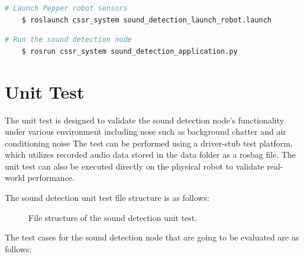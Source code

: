 \documentclass{CSSRforAfrica}
\begin{document}
\begin{lstlisting}[style=withoutNumbering, language=bash]
	# Launch Pepper robot sensors 
	$ roslaunch cssr_system sound_detection_launch_robot.launch
\end{lstlisting}

\begin{lstlisting}[style=withoutNumbering, language=bash]
	# Run the sound detection node
	$ rosrun cssr_system sound_detection_application.py
\end{lstlisting}

\newpage
\section{Unit Test}
The unit test is designed to validate the sound detection node's functionality under various environment including nose such as background chatter and air conditioning noise  
The test can be performed using a driver-stub test platform, which utilizes recorded audio data stored in the data folder as a rosbag file. The unit test can also 
be executed directly on the physical robot to validate real-world performance. 

The sound detection unit test file structure is as follows: 

\begin{figure}[h]	
	\renewcommand*\DTstyle{\ttfamily}
	\caption{File structure of the sound detection unit test.}
	\label{fig:sound_detection_unit_test}
\end{figure}

The test cases for the sound detection node that are going to be evaluated are as follows:
\end{document}
